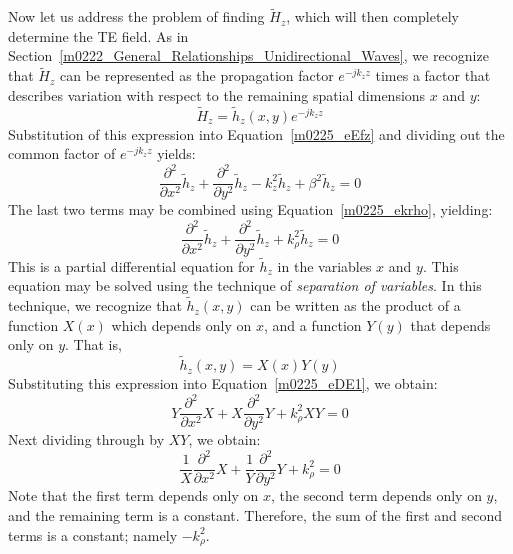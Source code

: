 Now let us address the problem of finding $\widetilde{H}_z$, which will then completely determine the TE field.  As in Section~\ref{m0222_General_Relationships_Unidirectional_Waves}, we recognize that $\widetilde{H}_z$ can be represented as the propagation factor $e^{-jk_z z}$ times a factor that describes variation with respect to the remaining spatial dimensions $x$ and $y$:
%
\begin{equation}
\widetilde{H}_z = \widetilde{h}_z(x,y) e^{-jk_z z} 
\end{equation}
%
Substitution of this expression into Equation~\ref{m0225_eEfz} and dividing out the common factor of $e^{-jk_z z}$ yields:
%
\begin{equation}
\frac{\partial^2}{\partial x^2}\widetilde{h}_z + \frac{\partial^2}{\partial y^2}\widetilde{h}_z - k_z^2 \widetilde{h}_z + \beta^2 \widetilde{h}_z = 0
\end{equation}
%
The last two terms may be combined using Equation~\ref{m0225_ekrho}, yielding:
%
\begin{equation}
\frac{\partial^2}{\partial x^2}\widetilde{h}_z + \frac{\partial^2}{\partial y^2}\widetilde{h}_z + k_{\rho}^2 \widetilde{h}_z = 0 \label{m0225_eDE1}
\end{equation}
%
This is a partial differential equation for $\widetilde{h}_z$ in the variables $x$ and $y$.
This equation may be solved using the technique of \emph{separation of variables}.
In this technique, we recognize that $\widetilde{h}_z(x,y)$ can be written as the product of a function $X(x)$ which depends only on $x$, and a function $Y(y)$ that depends only on $y$.
That is,
%
\begin{equation}
\widetilde{h}_z(x,y) = X(x) Y(y)
\end{equation}
%
Substituting this expression into Equation~\ref{m0225_eDE1}, we obtain:
%
\begin{equation}
Y\frac{\partial^2}{\partial x^2}X + X\frac{\partial^2}{\partial y^2}Y + k_{\rho}^2 XY = 0 \label{m0225_eDE2}
\end{equation}
%
Next dividing through by $XY$, we obtain:
%
\begin{equation}
\frac{1}{X}\frac{\partial^2}{\partial x^2}X + \frac{1}{Y}\frac{\partial^2}{\partial y^2}Y + k_{\rho}^2 = 0 \label{m0225_eDE3}
\end{equation}
%
Note that the first term depends only on $x$, the second term depends only on $y$, and the remaining term is a constant.
Therefore, the sum of the first and second terms is a constant; namely $-k_{\rho}^2$.
